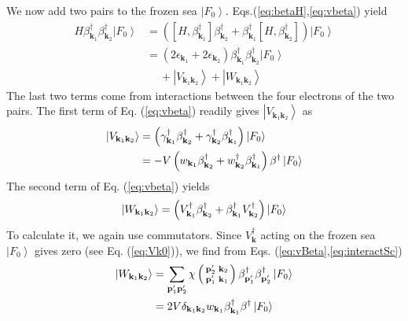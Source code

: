 \documentclass[epj]{svjour}
\newcommand{\vk}{\ensuremath{\mathbf{k}}}
\newcommand{\vp}{\ensuremath{\mathbf{p}}}
\begin{document}
We now add two pairs to the frozen sea $\left|F_0\right>$. Eqs.(\ref{eq:betaH},\ref{eq:vbeta}) yield 
\begin{equation}  \label{eq:SchTwo}
\begin{split}
H\beta^{\dagger}_{\mathbf{k} _1}\beta^{\dagger}_{\mathbf{k}
_2}\left|F_0\right>   &=\left(\left[H,\beta^{\dagger}_{\mathbf{k} _1}\right]
\beta^{\dagger}_{\mathbf{k} _2}+\beta^{\dagger}_{\mathbf{k} _1}\left[%
H,\beta^{\dagger}_{\mathbf{k} _2}\right]  \right) \left|F_0\right>   \\
&=\left(2\epsilon_{\mathbf{k} _1}+2\epsilon_{\mathbf{k} _2}\right)
\beta^{\dagger}_{\mathbf{k} _1}\beta^{\dagger}_{\mathbf{k}
_2}\left|F_0\right>\\
&\quad\:   +\left|V_{\mathbf{k} _1\mathbf{k} _2}\right>+\left|W_{\mathbf{k} _1\mathbf{k} _2}\right>  
\end{split}%
\end{equation}
The last two terms come from interactions between the four electrons of the two pairs.  The first term of Eq. (\ref{eq:vbeta}) readily gives $\left|V_{\mathbf{k} _1\mathbf{k} _2}\right> $ as 
\begin{equation}
\begin{split}
\left|V_{\mathbf{k} _1\mathbf{k} _2}\right>& =\left(\gamma^{\dagger}_{\mathbf{%
k} _1}\beta^{\dagger}_{\mathbf{k} _2}+\gamma^{\dagger}_{\mathbf{k}
_2}\beta^{\dagger}_{\mathbf{k} _1}\right) \left|F_0\right> \\
&=-V\left(w_{\mathbf{k} _1}\beta^{\dagger}_{\mathbf{k} _2}+w^{\dagger}_{\mathbf{k}
_2}\beta^{\dagger}_{\mathbf{k} _1}\right)\beta^\dagger \left|F_0\right>  
\end{split}
\end{equation}
The second term of Eq. (\ref{eq:vbeta}) yields
\begin{equation}
\left|W_{\mathbf{k} _1\mathbf{k} _2}\right> =\left(V^{\dagger}_{\mathbf{%
k} _1}\beta^{\dagger}_{\mathbf{k} _2}+\beta^{\dagger}_{\mathbf{k}
_1}V^{\dagger}_{\mathbf{k} _2}\right) \left|F_0\right> 
\end{equation}
To calculate it, we again use commutators.  Since  $V^{\dagger}_{\mathbf{k}}$ acting on the frozen sea $\left|F_0\right>$ gives zero (see Eq. (\ref{eq:Vk0})), we find from Eqs. (\ref{eq:vBeta},\ref{eq:interactSc}) 
\begin{equation}\label{eq:omega2}
\begin{split}
\left|W_{\mathbf{k} _1\mathbf{k} _2}\right>&=\sum_{\mathbf{p} ^{\prime}_1\mathbf{p}
^{\prime}_2}\chi\left(\begin{smallmatrix}\vp'_2&\vk_2\\\vp'_1&\vk_1%
\end{smallmatrix}\right)  \beta^{\dagger}_{\mathbf{p} ^{\prime}_1}\beta^{%
\dagger}_{\mathbf{p} ^{\prime}_2}\left|F_0\right> \\
&=2V\delta_{\mathbf{k} _1\mathbf{k} _2}w_{\mathbf{k} _1}\beta^{\dagger}_{
\mathbf{k} _1} \beta^{\dagger}\left|F_0\right> 
\end{split}
\end{equation}
\end{document}
